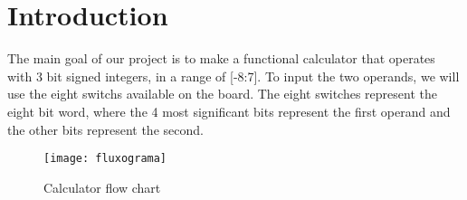 \section{Introduction}

The main goal of our project is to make a functional calculator that operates with 3 bit signed integers, in a range of [-8:7].
To input the two operands, we will use the eight switchs available on the board. The eight switches represent the eight bit word, where the 4 most significant bits represent the first operand and the other bits represent the second.

\begin{figure}[!htbp]
    \centerline{\texttt{[image: fluxograma]}}
    \vspace{0cm}\caption{Calculator flow chart}
    \label{fig:fluxograma}
\end{figure}
